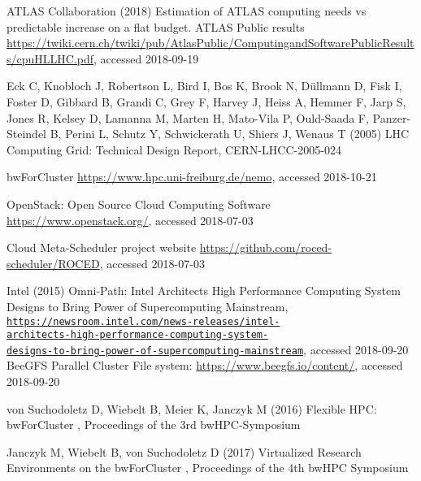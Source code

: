 \begin{thebibliography}{}
%
%
  ATLAS Collaboration (2018) Estimation of ATLAS computing needs vs
  predictable increase on a flat budget. ATLAS Public results
  \url{https://twiki.cern.ch/twiki/pub/AtlasPublic/ComputingandSoftwarePublicResults/cpuHLLHC.pdf},
  accessed 2018-09-19

	Eck C, Knobloch J, Robertson L, Bird I, Bos K, Brook
  N, Düllmann D, Fisk I, Foster D, Gibbard B, Grandi C, Grey F, Harvey
  J, Heiss A, Hemmer F, Jarp S, Jones R, Kelsey D, Lamanna M, Marten
  H, Mato-Vila P, Ould-Saada F, Panzer-Steindel B, Perini L, Schutz Y,
  Schwickerath U, Shiers J, Wenaus T (2005) LHC Computing Grid: Technical Design Report, 
  CERN-LHCC-2005-024


 bwForCluster \NEMO \url{https://www.hpc.uni-freiburg.de/nemo}, accessed 2018-10-21
  
OpenStack: Open Source Cloud Computing Software
\url{https://www.openstack.org/}, accessed 2018-07-03

\Roced Cloud Meta-Scheduler project website
\url{https://github.com/roced-scheduler/ROCED}, accessed 2018-07-03

 Intel (2015) Omni-Path:
Intel Architects High Performance Computing System Designs to Bring
Power of Supercomputing Mainstream,
\texttt{\href{https://newsroom.intel.com/news-releases/intel-architects-high-performance-computing-system-designs-to-bring-power-of-supercomputing-mainstream/}{https://newsroom.intel.com/news-releases/intel-\\architects-high-performance-computing-system-\\designs-to-bring-power-of-supercomputing-mainstream}}, accessed 2018-09-20
BeeGFS Parallel Cluster File system:
\url{https://www.beegfs.io/content/}, accessed 2018-09-20

 von Suchodoletz D,  Wiebelt B,  Meier K,  Janczyk M (2016)
  Flexible HPC: bwForCluster \NEMO,
  Proceedings of the 3rd bwHPC-Symposium %

 Janczyk M,  Wiebelt B, von Suchodoletz D (2017)
  Virtualized Research Environments on the bwForCluster \NEMO,
  Proceedings of the 4th bwHPC Symposium 



\end{thebibliography}
